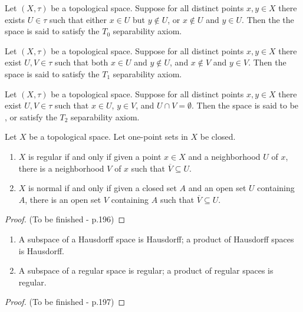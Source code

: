 \documentclass[12pt, a4paper, oneside, openright, titlepage]{book}
\begin{document}
\begin{definition}
    Let $(X,\tau)$ be a topological space. Suppose for all distinct points $x,y \in X$ there exists $U \in \tau$ such that either $x \in U$ but $y \notin U$, or $x \notin U$ and $y \in U$. Then the the space is said to satisfy the $T_0$ separability axiom.
\end{definition}


\begin{definition}
    Let $(X,\tau)$ be a topological space. Suppose for all distinct points $x,y \in X$ there exist $U,V \in \tau$ such that both $x \in U$ and $y \notin U$, and $x \notin V$ and $y \in V$. Then the space is said to satisfy the $T_1$ separability axiom.
\end{definition}


\begin{definition}
    Let $(X,\tau)$ be a topological space. Suppose for all distinct points $x,y \in X$ there exist $U,V \in \tau$ such that $x \in U$, $y \in V$, and $U\cap V = \emptyset$. Then the space is said to be , or satisfy the $T_2$ separability axiom.
\end{definition}

\begin{lemma}
    Let $X$ be a topological space. Let one-point sets in $X$ be closed. \begin{enumerate}
        \item $X$ is regular if and only if given a point $x \in X$ and a neighborhood $U$ of $x$, there is a neighborhood $V$ of $x$ such that $\overline{V} \subseteq U$.
        \item $X$ is normal if and only if given a closed set $A$ and an open set $U$ containing $A$, there is an open set $V$ containing $A$ such that $\overline{V}\subseteq U$.
    \end{enumerate}
\end{lemma}
\begin{proof}
    (To be finished - p.196)
\end{proof}

\begin{theorem}
    \leavevmode
    \begin{enumerate}
        \item A subspace of a Hausdorff space is Hausdorff; a product of Hausdorff spaces is Hausdorff.
        \item A subspace of a regular space is regular; a product of regular spaces is regular.
    \end{enumerate}
\end{theorem}
\begin{proof}
    (To be finished - p.197)
\end{proof}
\end{document}
